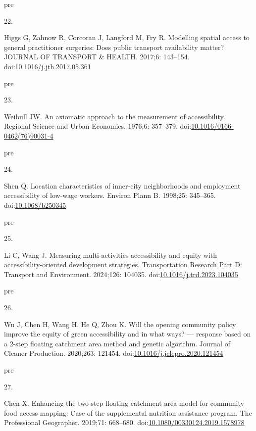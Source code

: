 \documentclass[10pt,letterpaper]{article}
\newlength{\cslhangindent}
\newlength{\csllabelwidth}
\newlength{\cslentryspacingunit} %
\newenvironment{CSLReferences}[2] %
 {%
  \setlength{\parindent}{0pt}
  \ifodd #1
  \let\oldpar\par
  \def\par{\hangindent=\cslhangindent\oldpar}
  \fi
  \setlength{\parskip}{#2\cslentryspacingunit}
 }%
 {}
\newcommand{\CSLLeftMargin}[1]{\parbox[t]{\csllabelwidth}{#1}}
\newcommand{\CSLRightInline}[1]{\parbox[t]{\linewidth - \csllabelwidth}{#1}\break}
\providecommand{\DIFaddtex}[1]{{\protect\color{blue}\uwave{#1}}} %
\providecommand{\DIFadd}[1]{\texorpdfstring{\DIFaddtex{#1}}{#1}} %
\begin{document}
\begin{CSLReferences}{0}{0}
\leavevmode\vadjust \DIFadd{pre}{\hypertarget{ref-higgsModellingSpatialAccess2017}{}}%
\CSLLeftMargin{22. }%
\CSLRightInline{Higgs G, Zahnow R, Corcoran J, Langford M, Fry R.
Modelling spatial access to general practitioner surgeries: Does public
transport availability matter? {JOURNAL} {OF} {TRANSPORT} \& {HEALTH}.
2017;6: 143--154.
doi:\href{https://doi.org/10.1016/j.jth.2017.05.361}{10.1016/j.jth.2017.05.361}}

\leavevmode\vadjust \DIFadd{pre}{\hypertarget{ref-weibullAxiomaticApproachMeasurement1976}{}}%
\CSLLeftMargin{23. }%
\CSLRightInline{Weibull JW. An axiomatic approach to the measurement of
accessibility. Regional Science and Urban Economics. 1976;6: 357--379.
doi:\href{https://doi.org/10.1016/0166-0462(76)90031-4}{10.1016/0166-0462(76)90031-4}}

\leavevmode\vadjust \DIFadd{pre}{\hypertarget{ref-shenLocationCharacteristicsInnercity1998}{}}%
\CSLLeftMargin{24. }%
\CSLRightInline{Shen Q. Location characteristics of inner-city
neighborhoods and employment accessibility of low-wage workers. Environ
Plann B. 1998;25: 345--365.
doi:\href{https://doi.org/10.1068/b250345}{10.1068/b250345}}

\leavevmode\vadjust \DIFadd{pre}{\hypertarget{ref-liMeasuringMultiactivitiesAccessibility2024a}{}}%
\CSLLeftMargin{25. }%
\CSLRightInline{Li C, Wang J. Measuring multi-activities accessibility
and equity with accessibility-oriented development strategies.
Transportation Research Part D: Transport and Environment. 2024;126:
104035.
doi:\href{https://doi.org/10.1016/j.trd.2023.104035}{10.1016/j.trd.2023.104035}}

\leavevmode\vadjust \DIFadd{pre}{\hypertarget{ref-wuWillOpeningCommunity2020}{}}%
\CSLLeftMargin{26. }%
\CSLRightInline{Wu J, Chen H, Wang H, He Q, Zhou K. Will the opening
community policy improve the equity of green accessibility and in what
ways? --- response based on a 2-step floating catchment area method and
genetic algorithm. Journal of Cleaner Production. 2020;263: 121454.
doi:\href{https://doi.org/10.1016/j.jclepro.2020.121454}{10.1016/j.jclepro.2020.121454}}

\leavevmode\vadjust \DIFadd{pre}{\hypertarget{ref-chenEnhancingTwoStepFloating2019}{}}%
\CSLLeftMargin{27. }%
\CSLRightInline{Chen X. Enhancing the two-step floating catchment area
model for community food access mapping: Case of the supplemental
nutrition assistance program. The Professional Geographer. 2019;71:
668--680.
doi:\href{https://doi.org/10.1080/00330124.2019.1578978}{10.1080/00330124.2019.1578978}}


\end{CSLReferences}
\end{document}

